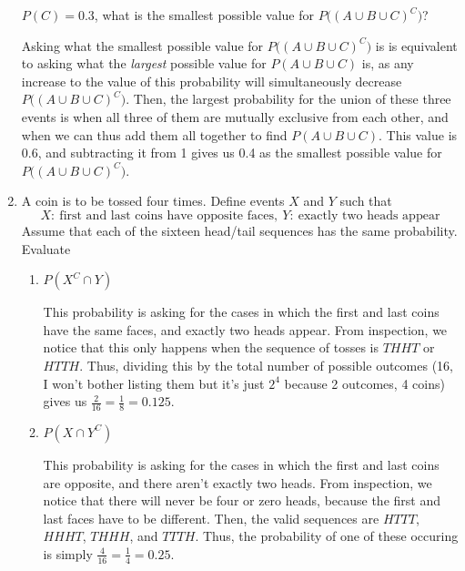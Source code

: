 \documentclass{article}
\begin{document}
\begin{enumerate}
    \(P(C) = 0.3\), what is the smallest possible value for \(P\big({(A\cup B \cup C)}^C\big)\)?\begin{solution}
        Asking what the smallest possible value for \(P\big({(A\cup B \cup C)}^C\big)\) is is equivalent to asking what the \textit{largest} possible value for \(P(A\cup{}B\cup{}C)\)    
        is, as any increase to the value of this probability will simultaneously decrease \(P\big({(A\cup B \cup C)}^C\big)\). Then, the largest probability for the union of these three 
        events is when all three of them are mutually exclusive from each other, and when we can thus add them all together to find \(P(A\cup{}B\cup{}C)\). This value is 0.6, and 
        subtracting it from 1 gives us 0.4 as the smallest possible value for \(P\big({(A\cup B \cup C)}^C\big)\). 
        \end{solution}
    \item A coin is to be tossed four times. Define events \(X\) and \(Y\) such that\[ 
        X\!:~\text{first and last coins have opposite faces},~Y\!:~\text{exactly two heads appear}
    \] Assume that each of the sixteen head/tail sequences has the same probability. Evaluate\begin{enumerate}
        \item \(P(X^C\cap{}Y)\)\begin{solution}
            This probability is asking for the cases in which the first and last coins have the same faces, and exactly two heads appear. From inspection, we notice that this only happens 
            when the sequence of tosses is \(THHT\) or \(HTTH\). Thus, dividing this by the total number of possible outcomes (16, I won't bother listing them but it's just \(2^4\) because
            2 outcomes, 4 coins) gives us \(\frac{2}{16} = \frac{1}{8} = 0.125\). 
        \end{solution}
        \item \(P(X\cap{}Y^C)\)\begin{solution}
            This probability is asking for the cases in which the first and last coins are opposite, and there aren't exactly two heads. From inspection, we notice that there will never be four or zero 
            heads, because the first and last faces have to be different. Then, the valid sequences are \(HTTT\), \(HHHT\), \(THHH\), and \(TTTH\). Thus, the probability of one of these 
            occuring is simply \(\frac{4}{16} = \frac{1}{4} = 0.25\).
        \end{solution}
    \end{enumerate} 

\end{enumerate}
\end{document}
